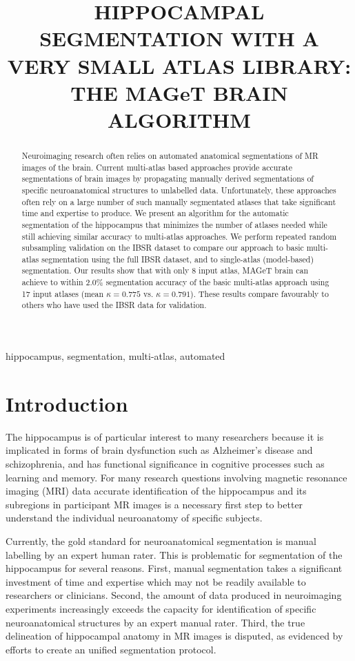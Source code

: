 \documentclass{article}\usepackage{graphicx, color}
\title{HIPPOCAMPAL SEGMENTATION WITH A VERY SMALL ATLAS LIBRARY: THE MAGeT
BRAIN ALGORITHM}
\begin{document}
\maketitle       

\begin{abstract}
Neuroimaging research often relies on automated anatomical segmentations of MR
images of the brain. Current multi-atlas based approaches provide accurate
segmentations of brain images by propagating manually derived segmentations of
specific neuroanatomical structures to unlabelled data. Unfortunately, these
approaches often rely on a large number of such manually segmentated atlases
that take significant time and expertise to produce. We present an algorithm
for the automatic segmentation of the hippocampus that minimizes the number of
atlases needed while still achieving similar accuracy to multi-atlas
approaches.  We perform repeated random subsampling validation on the IBSR
dataset to compare our approach to basic multi-atlas segmentation using
the full IBSR dataset, and to single-atlas (model-based) segmentation. Our
results show that with only 8 input atlas, MAGeT brain can achieve to within
2.0\% segmentation accuracy of the basic multi-atlas approach using 17
input atlases (mean $\kappa = 0.775$ vs.  $\kappa = 0.791$).  These results
compare favourably to others who have used the IBSR data for validation. 
\end{abstract}

\begin{keywords}
hippocampus, segmentation, multi-atlas, automated
\end{keywords}

\section{Introduction}
\label{sec:intro}

The hippocampus is of particular interest to many researchers because it is
implicated in forms of brain dysfunction such as Alzheimer's disease and
schizophrenia, and has functional significance in cognitive processes such as
learning and memory.  For many research questions involving magnetic resonance
imaging (MRI) data accurate identification of the hippocampus and its
subregions in participant MR images is a necessary first step to better
understand the individual neuroanatomy of specific subjects.  

Currently, the gold standard for neuroanatomical segmentation is manual
labelling by an expert human rater.  This is problematic for segmentation of
the hippocampus for several reasons.  First, manual segmentation takes a
significant investment of time and expertise \cite{Hammers2003} which may not
be readily available to researchers or clinicians.  Second, the amount of data
produced in neuroimaging experiments increasingly exceeds the capacity for
identification of specific neuroanatomical structures by an expert manual
rater.  Third, the true delineation of hippocampal anatomy in MR images is
disputed\cite{Geuze2004}, as evidenced by efforts to create an unified
segmentation protocol\cite{Jack2011}.  
\end{document}
